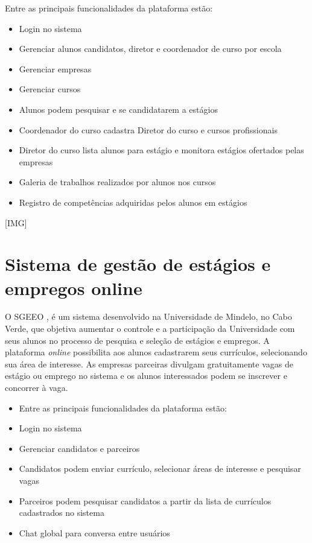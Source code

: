 \documentclass[cic,tc]{iiufrgs}
\begin{document}
Entre as principais funcionalidades da plataforma estão:
\begin{itemize}
    \item Login no sistema
    \item Gerenciar alunos candidatos, diretor e coordenador de curso por escola
    \item Gerenciar empresas 
    \item Gerenciar cursos
    \item Alunos podem pesquisar e se candidatarem a estágios
    \item Coordenador do curso cadastra Diretor do curso e cursos profissionais
    \item Diretor do curso lista alunos para estágio e monitora estágios ofertados pelas empresas
    \item Galeria de trabalhos realizados por alunos nos cursos
    \item Registro de competências adquiridas pelos alunos em estágios
\end{itemize}

[IMG]

\section{Sistema de gestão de estágios e empregos online}
\label{trabRelSistEmprego}

O SGEEO \cite{SGEEOMono} , é um sistema desenvolvido na Universidade de Mindelo, no Cabo Verde, que objetiva aumentar o controle e a participação da Universidade com seus alunos no processo de pesquisa e seleção de estágios e empregos. A plataforma \textit{online} possibilita aos alunos cadastrarem seus currículos, selecionando sua área de interesse. As empresas parceiras divulgam gratuitamente vagas de estágio ou emprego no sistema e os alunos interessados podem se inscrever e concorrer à vaga.

\begin{itemize}
    \item Entre as principais funcionalidades da plataforma estão:
    \item Login no sistema
    \item Gerenciar candidatos e parceiros
    \item Candidatos podem enviar currículo, selecionar áreas de interesse e pesquisar vagas
    \item Parceiros podem pesquisar candidatos a partir da lista de currículos cadastrados no sistema
    \item Chat global para conversa entre usuários
\end{itemize}
\end{document}
